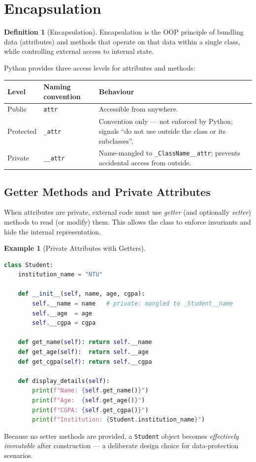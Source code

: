 \documentclass[11pt, a4paper, notitlepage]{report}
\theoremstyle{definition}
\newtheorem{definition}[theorem]{Definition}
\theoremstyle{remark}
\theoremstyle{definition}
\newtheorem{example}[theorem]{Example}
\begin{document}
\section{Encapsulation}
\label{sec:encapsulation}

\begin{definition}[Encapsulation]
Encapsulation is the OOP principle of bundling data (attributes) and methods
that operate on that data within a single class, while controlling external
access to internal state.
\end{definition}

Python provides three access levels for attributes and methods:

\begin{center}
\begin{tabularx}{\linewidth}{llX}
\toprule
\textbf{Level} & \textbf{Naming convention} & \textbf{Behaviour} \\
\midrule
Public    & \texttt{attr}    & Accessible from anywhere. \\
Protected & \texttt{\_attr}  & Convention only --- not enforced by Python;
                               signals ``do not use outside the class or its
                               subclasses''. \\
Private   & \texttt{\_\_attr} & Name-mangled to \texttt{\_ClassName\_\_attr};
                                prevents accidental access from outside. \\
\bottomrule
\end{tabularx}
\end{center}

\subsection{Getter Methods and Private Attributes}
\label{subsec:getters}

When attributes are private, external code must use \emph{getter} (and optionally
\emph{setter}) methods to read (or modify) them. This allows the class to enforce
invariants and hide the internal representation.

\begin{example}[Private Attributes with Getters]
\leavevmode
\begin{lstlisting}[language=Python]
class Student:
    institution_name = "NTU"

    def __init__(self, name, age, cgpa):
        self.__name = name   # private: mangled to _Student__name
        self.__age  = age
        self.__cgpa = cgpa

    def get_name(self): return self.__name
    def get_age(self):  return self.__age
    def get_cgpa(self): return self.__cgpa

    def display_details(self):
        print(f"Name: {self.get_name()}")
        print(f"Age:  {self.get_age()}")
        print(f"CGPA: {self.get_cgpa()}")
        print(f"Institution: {Student.institution_name}")
\end{lstlisting}
Because no setter methods are provided, a \texttt{Student} object becomes
\emph{effectively immutable} after construction --- a deliberate design choice
for data-protection scenarios.
\end{example}
\end{document}
